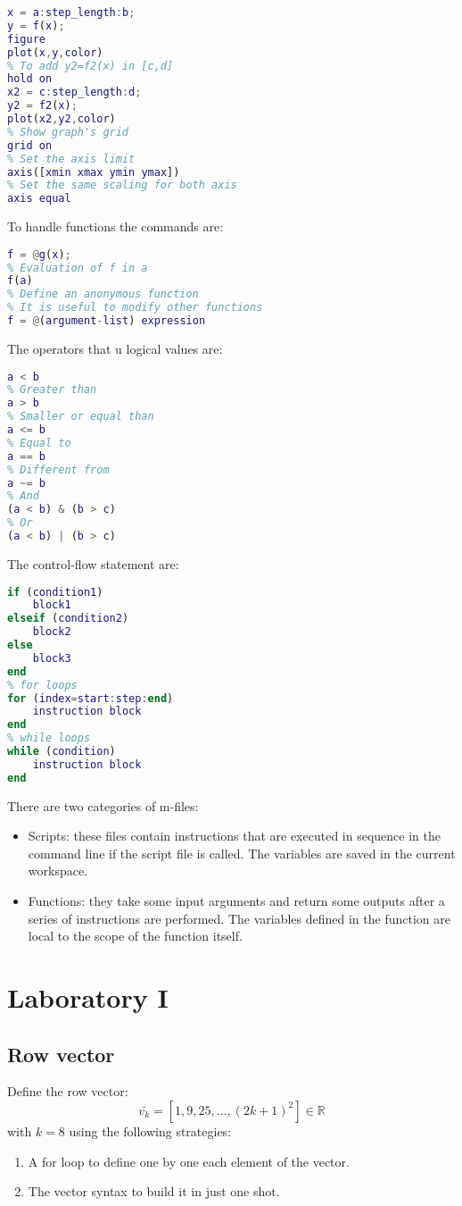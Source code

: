 \documentclass[12pt, a4paper]{report}
\begin{document}
    \begin{lstlisting}[language=Matlab]
% To plot y=f(x) in [a,b]
x = a:step_length:b;
y = f(x);   
figure         
plot(x,y,color)
% To add y2=f2(x) in [c,d]
hold on 
x2 = c:step_length:d;
y2 = f2(x);
plot(x2,y2,color)     
% Show graph's grid
grid on 
% Set the axis limit
axis([xmin xmax ymin ymax]) 
% Set the same scaling for both axis
axis equal 
    \end{lstlisting} 
    To handle functions the commands are: 
    \begin{lstlisting}[language=Matlab]
% Define a function handle to g(x)
f = @g(x);
% Evaluation of f in a
f(a) 
% Define an anonymous function
% It is useful to modify other functions
f = @(argument-list) expression
    \end{lstlisting} 
    The operators that u logical values are:  
    \begin{lstlisting}[language=Matlab]
% Smaller than
a < b     
% Greater than
a > b
% Smaller or equal than
a <= b   
% Equal to
a == b    
% Different from
a ~= b  
% And
(a < b) & (b > c)  
% Or   
(a < b) | (b > c)     
    \end{lstlisting} 
    The control-flow statement are: 
    \begin{lstlisting}[language=Matlab]
% if-then-else statements
if (condition1)
    block1
elseif (condition2)
    block2
else
    block3
end
% for loops
for (index=start:step:end)
    instruction block
end
% while loops
while (condition)
    instruction block
end
    \end{lstlisting}    
    There are two categories of m-files: 
    \begin{itemize}
        \item Scripts: these files contain instructions that are executed in sequence in the command line if the script file is called. 
            The variables are saved in the current workspace.
        \item Functions: they take some input arguments and return some outputs after a series of instructions are performed. 
            The variables defined in the function are local to the scope of the function itself.
    \end{itemize}

\newpage

\chapter{Laboratory I}
    \section{Row vector}
        Define the row vector: 
        \[ \bar{v_k} = [1,9,25,\dots,\left( 2k+1 \right)^2] \in \mathbb{R} \]
        with $k=8$ using the following strategies:
        \begin{enumerate}
            \item A for loop to define one by one each element of the vector.
            \item The vector syntax to build it in just one shot.
        \end{enumerate}
\end{document}
